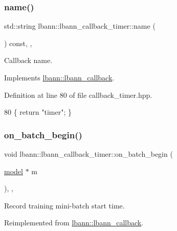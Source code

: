 \subsubsection{\texorpdfstring{name()}{name()}}
{\footnotesize\ttfamily std\+::string lbann\+::lbann\+\_\+callback\+\_\+timer\+::name (\begin{DoxyParamCaption}{ }\end{DoxyParamCaption}) const\hspace{0.3cm}{\ttfamily [inline]}, {\ttfamily [override]}, {\ttfamily [virtual]}}

Callback name. 

Implements \hyperlink{classlbann_1_1lbann__callback_a7522c7a14f1d6a1ea762cc2d7248eb3a}{lbann\+::lbann\+\_\+callback}.



Definition at line 80 of file callback\+\_\+timer.\+hpp.


\begin{DoxyCode}
80 \{ \textcolor{keywordflow}{return} \textcolor{stringliteral}{"timer"}; \}
\end{DoxyCode}
\mbox{\label{classlbann_1_1lbann__callback__timer_aa6b016b9fb470a7614ab4147ae105002}} 
\subsubsection{\texorpdfstring{on\+\_\+batch\+\_\+begin()}{on\_batch\_begin()}}
{\footnotesize\ttfamily void lbann\+::lbann\+\_\+callback\+\_\+timer\+::on\+\_\+batch\+\_\+begin (\begin{DoxyParamCaption}\item[{\hyperlink{classlbann_1_1model}{model} $\ast$}]{m }\end{DoxyParamCaption})\hspace{0.3cm}{\ttfamily [inline]}, {\ttfamily [override]}, {\ttfamily [virtual]}}

Record training mini-\/batch start time. 

Reimplemented from \hyperlink{classlbann_1_1lbann__callback_a9ecf4e44cd4021cdd687de14c850cc83}{lbann\+::lbann\+\_\+callback}.



